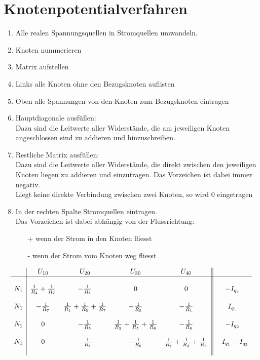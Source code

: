 \section{Knotenpotentialverfahren}
\begin{enumerate}
  \item Alle realen Spannungsquellen in Stromquellen umwandeln. 
  \item Knoten nummerieren
  \item Matrix aufstellen
  \item Links alle Knoten ohne den Bezugsknoten auflisten
  \item Oben alle Spannungen von den Knoten zum Bezugsknoten eintragen
  \item Hauptdiagonale ausfüllen: \\
  Dazu sind die Leitwerte aller Widerstände, die am jeweiligen Knoten angeschlossen sind zu addieren und hinzuschreiben. 
  \item Restliche Matrix ausfüllen: \\
  Dazu sind die Leitwerte aller Widerstände, die direkt zwischen den jeweiligen Knoten liegen zu addieren und einzutragen. Das Vorzeichen ist dabei immer negativ. \\
  Liegt keine direkte Verbindung zwischen zwei Knoten, so wird 0 eingetragen
  \item In der rechten Spalte Stromquellen eintragen. \\
  Das Vorzeichen ist dabei abhängig von der Flussrichtung: \\
  \begin{itemize}
    \item[+] wenn der Strom in den Knoten fliesst
    \item[-] wenn der Strom vom Knoten weg fliesst
  \end{itemize}
\end{enumerate}
\footnotesize
\[ \begin{array}{l|cccc||c}
               &U_{10}&U_{20}&U_{30}&U_{40}&\\
\hline&&&&&\\
N_1 & \frac{1}{R_4}+\frac{1}{R_7} &                            -\frac{1}{R_1} &                                         0 &                                         0 &         -I_{q_4}\\
&&&&&\\
N_1 &              -\frac{1}{R_7} & \frac{1}{R_1}+\frac{1}{R_5}+\frac{1}{R_7} &                            -\frac{1}{R_5} &                            -\frac{1}{R_1} &          I_{q_1}\\
&&&&&\\
N_1 &                           0 &                            -\frac{1}{R_5} & \frac{1}{R_2}+\frac{1}{R_5}+\frac{1}{R_6} &                            -\frac{1}{R_6} &         -I_{q_2}\\
&&&&&\\
N_1 &                           0 &                            -\frac{1}{R_1} &                            -\frac{1}{R_6} & \frac{1}{R_1}+\frac{1}{R_3}+\frac{1}{R_6} & -I_{q_1}-I_{q_3}\\
&&&&&\\
\end{array}\]
\normalsize